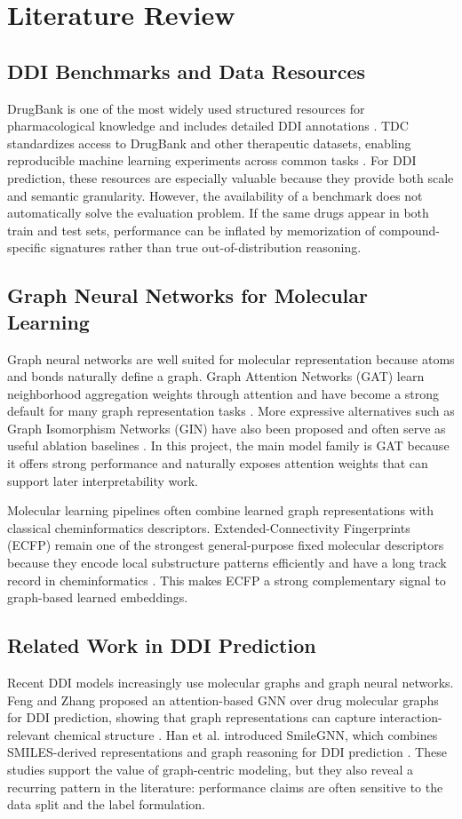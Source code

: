 \documentclass[12pt,a4paper]{report}
\begin{document}
\chapter{Literature Review}
\section{DDI Benchmarks and Data Resources}
DrugBank is one of the most widely used structured resources for pharmacological knowledge and includes detailed DDI annotations \cite{wishart2018drugbank}. TDC standardizes access to DrugBank and other therapeutic datasets, enabling reproducible machine learning experiments across common tasks \cite{huang2021tdc}. For DDI prediction, these resources are especially valuable because they provide both scale and semantic granularity. However, the availability of a benchmark does not automatically solve the evaluation problem. If the same drugs appear in both train and test sets, performance can be inflated by memorization of compound-specific signatures rather than true out-of-distribution reasoning.

\section{Graph Neural Networks for Molecular Learning}
Graph neural networks are well suited for molecular representation because atoms and bonds naturally define a graph. Graph Attention Networks (GAT) learn neighborhood aggregation weights through attention and have become a strong default for many graph representation tasks \cite{velickovic2018gat}. More expressive alternatives such as Graph Isomorphism Networks (GIN) have also been proposed and often serve as useful ablation baselines \cite{xu2019gin}. In this project, the main model family is GAT because it offers strong performance and naturally exposes attention weights that can support later interpretability work.

Molecular learning pipelines often combine learned graph representations with classical cheminformatics descriptors. Extended-Connectivity Fingerprints (ECFP) remain one of the strongest general-purpose fixed molecular descriptors because they encode local substructure patterns efficiently and have a long track record in cheminformatics \cite{rogers2010ecfp}. This makes ECFP a strong complementary signal to graph-based learned embeddings.

\section{Related Work in DDI Prediction}
Recent DDI models increasingly use molecular graphs and graph neural networks. Feng and Zhang proposed an attention-based GNN over drug molecular graphs for DDI prediction, showing that graph representations can capture interaction-relevant chemical structure \cite{feng2022gnnddi}. Han et al. introduced SmileGNN, which combines SMILES-derived representations and graph reasoning for DDI prediction \cite{han2022smilegnn}. These studies support the value of graph-centric modeling, but they also reveal a recurring pattern in the literature: performance claims are often sensitive to the data split and the label formulation.
\end{document}
